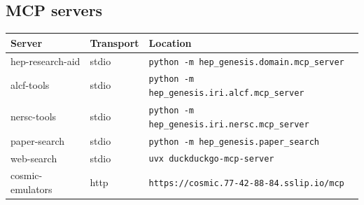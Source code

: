 \documentclass[11pt,a4paper]{article}
\begin{document}
\subsection{MCP servers}
\begin{longtable}{@{}p{}p{}p{}@{}}
\toprule Server & Transport & Location \\ \midrule \endhead
hep-research-aid & stdio & \texttt{python -m hep\_\allowbreak{}genesis.domain.mcp\_\allowbreak{}server} \\
alcf-tools & stdio & \texttt{python -m hep\_\allowbreak{}genesis.iri.alcf.mcp\_\allowbreak{}server} \\
nersc-tools & stdio & \texttt{python -m hep\_\allowbreak{}genesis.iri.nersc.mcp\_\allowbreak{}server} \\
paper-search & stdio & \texttt{python -m hep\_\allowbreak{}genesis.paper\_\allowbreak{}search} \\
web-search & stdio & \texttt{uvx duckduckgo-mcp-server} \\
cosmic-emulators & http & \texttt{https:\allowbreak{}/\allowbreak{}/\allowbreak{}cosmic.77-42-88-84.sslip.io/\allowbreak{}mcp} \\
\bottomrule\end{longtable}
\end{document}
